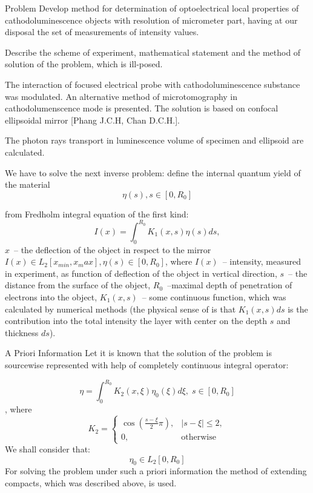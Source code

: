 \documentclass{beamer}
\begin{document}
\begin{frame}[c, allowframebreaks]{Problem}
    Develop method for determination of optoelectrical local properties of cathodoluminescence
    objects with resolution of micrometer part, having at our disposal the set of measurements
    of intensity values.

    Describe the scheme of experiment, mathematical statement and the method of  solution of the
    problem, which is ill-posed.

    The interaction of focused electrical probe with cathodoluminescence substance was modulated. An
    alternative method of microtomography in cathodolumenscence mode is presented. The solution is
    based on confocal ellipsoidal mirror [Phang J.C.H, Chan D.C.H.].

    The photon rays transport in luminescence volume of specimen and ellipsoid are calculated.

    \framebreak

    We have to solve the next inverse problem:
define the internal quantum yield of the material
$$ \eta (s), s \in [0, R_0] $$

from Fredholm integral equation of the first kind:
$$ I(x) = \int_0^{R_0} K_1 (x, s) \eta (s) ds, $$
$x$~-- the deflection of the object in respect to the mirror $ I(x) \in L_2 [x_{min}, x_max],
\eta (s) \in [0, R_0]$, where $I(x)$~-- intensity, measured in experiment, as function of deflection
of the object in vertical direction, $s$~-- the distance from the surface of the object,
$R_0$~--maximal depth of penetration of electrons into the object, $K_1(x,s)$~-- some continuous
function, which was calculated by numerical methods (the physical sense of  is that $K_1(x,s) ds$ is
the contribution into the total intensity the layer with center on the depth $s$ and thickness
$ds$).

\end{frame}

\begin{frame}[c]{A Priori Information}
    Let it is known that the solution of the problem is sourcewise represented with help of
    completely continuous integral operator:

    $$ \eta = \int_0^{R_0} K_2(x,\xi) \eta_0(\xi)d\xi, \; s \in [0, R_0] $$,
    where
    $$ K_2 = \left\{
        \begin{array}{cc}
            \cos{ ( \frac{s - \xi}{2} \pi) }, & |s - \xi| \le 2, \\
            0, & \text{otherwise}
        \end{array}
        \right.
    $$
    We shall consider that:
    $$ \eta_0 \in L_2[0,R_0] $$
    For solving the problem under such a priori information the method of extending compacts,
    which was described above, is used.
\end{frame}
\end{document}
